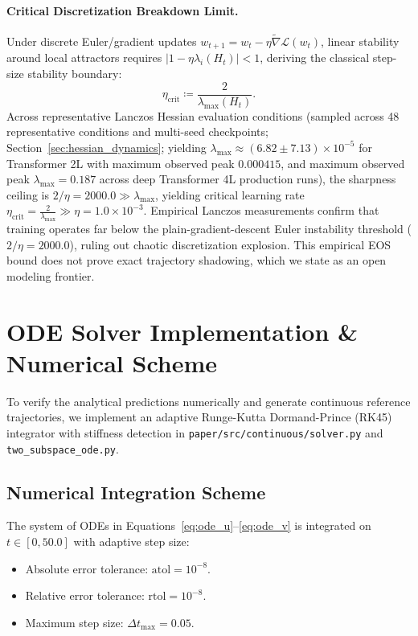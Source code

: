 \documentclass{article}
\theoremstyle{plain}
\theoremstyle{definition}
\begin{document}
\paragraph{Critical Discretization Breakdown Limit.}
Under discrete Euler/gradient updates $w_{t+1} = w_t - \eta \tilde{\nabla} \mathcal{L}(w_t)$, linear stability around local attractors requires $|1 - \eta \lambda_i(H_t)| < 1$, deriving the classical step-size stability boundary:
\begin{equation}
    \eta_{\text{crit}} \coloneqq \frac{2}{\lambda_{\text{max}}(H_t)}.
\end{equation}
Across representative Lanczos Hessian evaluation conditions (sampled across 48 representative conditions and multi-seed checkpoints; Section~\ref{sec:hessian_dynamics}; yielding $\lambda_{\text{max}} \approx (6.82 \pm 7.13) \times 10^{-5}$ for Transformer 2L with maximum observed peak $0.000415$, and maximum observed peak $\lambda_{\text{max}} = 0.187$ across deep Transformer 4L production runs), the sharpness ceiling is $2/\eta = 2000.0 \gg \lambda_{\text{max}}$, yielding critical learning rate $\eta_{\text{crit}} = \frac{2}{\lambda_{\text{max}}} \gg \eta = 1.0 \times 10^{-3}$. Empirical Lanczos measurements confirm that training operates far below the plain-gradient-descent Euler instability threshold ($2/\eta = 2000.0$), ruling out chaotic discretization explosion. This empirical EOS bound does not prove exact trajectory shadowing, which we state as an open modeling frontier.
\section{ODE Solver Implementation \& Numerical Scheme}
\label{sec:appendix_solver}

To verify the analytical predictions numerically and generate continuous reference trajectories, we implement an adaptive Runge-Kutta Dormand-Prince (RK45) integrator with stiffness detection in \texttt{paper/src/continuous/solver.py} and \texttt{two\_subspace\_ode.py}.

\subsection{Numerical Integration Scheme}
The system of ODEs in Equations~\eqref{eq:ode_u}--\eqref{eq:ode_v} is integrated on $t \in [0, 50.0]$ with adaptive step size:
\begin{itemize}[noitemsep]
    \item Absolute error tolerance: $\text{atol} = 10^{-8}$.
    \item Relative error tolerance: $\text{rtol} = 10^{-8}$.
    \item Maximum step size: $\Delta t_{\text{max}} = 0.05$.
\end{itemize}
\end{document}
